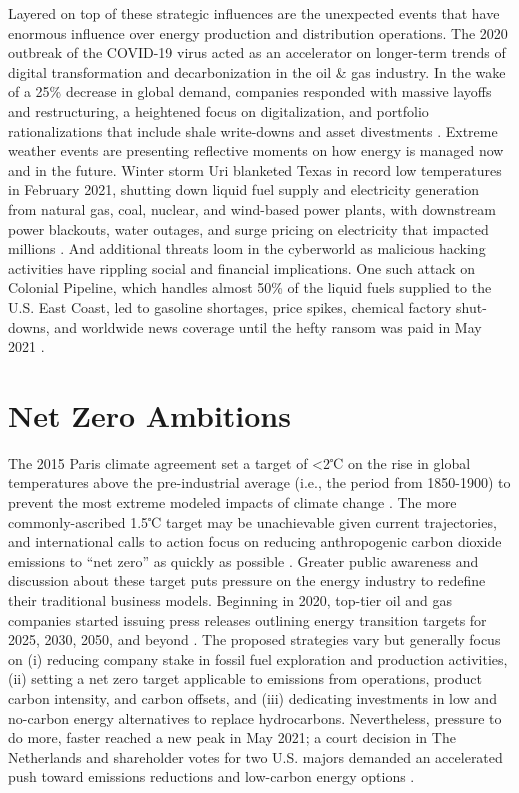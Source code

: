 Layered on top of these strategic influences are the unexpected events that have enormous influence over energy production and distribution operations. The 2020 outbreak of the COVID-19 virus acted as an accelerator on longer-term trends of digital transformation and decarbonization in the oil \& gas industry. In the wake of a 25\% decrease in global demand, companies responded with massive layoffs and restructuring, a heightened focus on digitalization, and portfolio rationalizations that include shale write-downs and asset divestments \citep{deloitte_2021_2020}. Extreme weather events are presenting reflective moments on how energy is managed now and in the future. Winter storm Uri blanketed Texas in record low temperatures in February 2021, shutting down liquid fuel supply and electricity generation from natural gas, coal, nuclear, and wind-based power plants, with downstream power blackouts, water outages, and surge pricing on electricity that impacted millions \citep{harc_winter_2021,lazard_lazards_2020}. And additional threats loom in the cyberworld as malicious hacking activities have rippling social and financial implications. One such attack on Colonial Pipeline, which handles almost 50\% of the liquid fuels supplied to the U.S. East Coast, led to gasoline shortages, price spikes, chemical factory shut-downs, and worldwide news coverage until the hefty ransom was paid in May 2021 \citep{sanger_pipeline_2021}.

\section{Net Zero Ambitions}\label{ch1:netzero}
The 2015 Paris climate agreement set a target of <2℃ on the rise in global temperatures above the pre-industrial average (i.e., the period from 1850-1900) to prevent the most extreme modeled impacts of climate change \citep{unfccc_paris_2015}. The more commonly-ascribed 1.5℃ target may be unachievable given current trajectories, and international calls to action focus on reducing anthropogenic carbon dioxide emissions to “net zero” as quickly as possible \citep{ipcc_global_2018}. Greater public awareness and discussion about these target puts pressure on the energy industry to redefine their traditional business models. Beginning in 2020, top-tier oil and gas companies started issuing press releases outlining energy transition targets for 2025, 2030, 2050, and beyond \citep{bp_international_2020,chevron_chevron_2021,conocophillips_conocophillips_2020,equinor_equinor_2020,exxonmobil_exxonmobil_2021,shell_responsible_2020,shell_shell_2021,total_total_2020,total_2020_2021}. The proposed strategies vary but generally focus on (i) reducing company stake in fossil fuel exploration and production activities, (ii) setting a net zero target applicable to emissions from operations, product carbon intensity, and carbon offsets, and (iii) dedicating investments in low and no-carbon energy alternatives to replace hydrocarbons. Nevertheless, pressure to do more, faster reached a new peak in May 2021; a court decision in The Netherlands and shareholder votes for two U.S. majors demanded an accelerated push toward emissions reductions and low-carbon energy options \citep{mcwilliams_investors_2021}.

